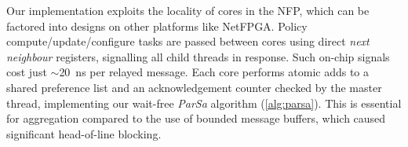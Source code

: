 
Our implementation exploits the locality of cores in the NFP, which can be factored into designs on other platforms like NetFPGA.
Policy compute/update/configure tasks are passed between cores using direct \emph{next neighbour} registers, signalling all child threads in response.
Such on-chip signals cost just $\sim$\qty{20}{\nano\second} per relayed message.
Each core performs atomic adds to a shared preference list and an acknowledgement counter checked by the master thread, implementing our wait-free \emph{ParSa} algorithm (\cref{alg:parsa}).
This is essential for aggregation compared to the use of bounded message buffers, which caused significant head-of-line blocking.

%



